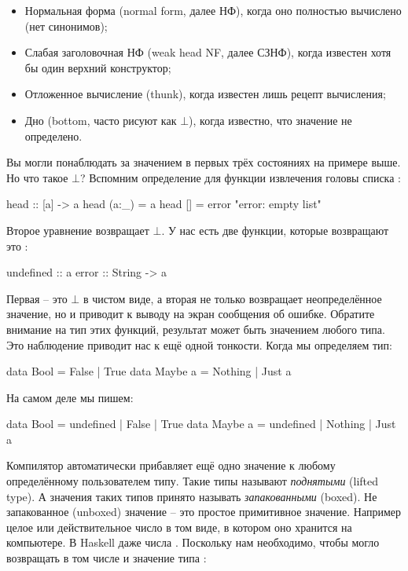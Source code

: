 \begin{itemize}
\item Нормальная форма (normal form, далее НФ),
    когда оно полностью вычислено (нет синонимов);

\item Слабая заголовочная НФ (weak head NF, далее СЗНФ), 
    когда известен хотя бы один верхний конструктор;

\item Отложенное вычисление (thunk), 
    когда известен лишь рецепт вычисления;

\item Дно (bottom, часто рисуют как $\bot$), 
    когда известно, что значение не определено.
\end{itemize}


Вы могли понаблюдать за значением в первых трёх состояниях
на примере выше. Но что такое $\bot$? Вспомним определение
для функции извлечения головы списка :

\begin{code}
head :: [a] -> a
head (a:_)  = a
head []     = error "error: empty list" 
\end{code}

Второе уравнение возвращает $\bot$. У нас есть две функции,
которые возвращают это :

\begin{code}
undefined   :: a
error       :: String -> a
\end{code}

Первая -- это $\bot$ в чистом виде, а вторая не только возвращает
неопределённое значение, но и приводит к выводу на экран 
сообщения об ошибке. Обратите внимание на тип этих функций,
результат может быть значением любого типа. Это наблюдение
приводит нас к ещё одной тонкости. Когда мы определяем тип:

\begin{code}
data Bool       = False | True
data Maybe a    = Nothing | Just a
\end{code}

На самом деле мы пишем:

\begin{code}
data Bool       = undefined | False | True
data Maybe a    = undefined | Nothing | Just a
\end{code}

Компилятор автоматически прибавляет ещё одно значение
к любому определённому пользователем типу. Такие
типы называют \emph{поднятыми} (lifted type). А значения
таких типов принято называть \emph{запакованными} (boxed).
Не запакованное (unboxed) значение -- это простое примитивное значение.
Например целое или действительное число в том виде, в котором
оно хранится на компьютере. В Haskell даже числа .
Поскольку нам необходимо, чтобы  могло возвращать
в том числе и значение типа :

